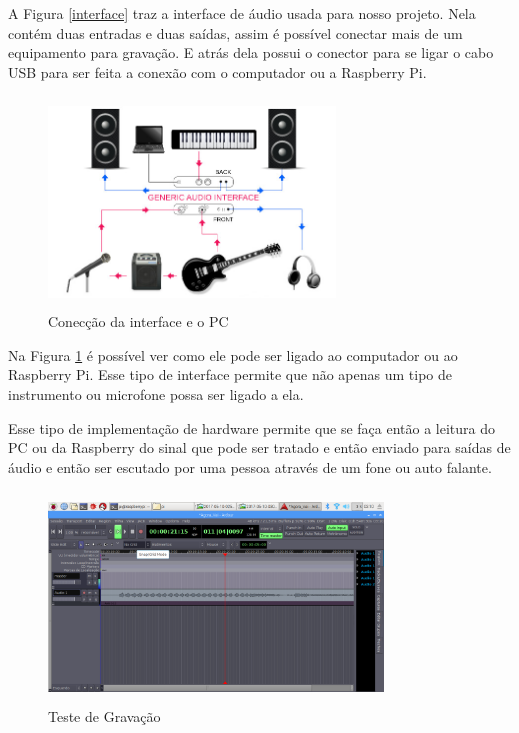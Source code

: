 \documentclass[conference]{IEEEtran}
\begin{document}
A Figura \ref{interface} traz a interface de áudio usada para nosso projeto. Nela contém duas entradas e duas saídas, assim é possível conectar mais de um equipamento para gravação. E atrás dela possui o conector para se ligar o cabo USB para ser feita a conexão com o computador ou a Raspberry Pi.

\begin{figure}[!htb]
\centering
\includegraphics[width=3.0in, height=2.2in]{Imagens/conection}
\caption{Conecção da interface e o PC} 
\label{conection}
\end{figure}

Na Figura \ref{conection} é possível ver como ele pode ser ligado ao computador ou ao Raspberry Pi. Esse tipo de interface permite que não apenas um tipo de instrumento ou microfone possa ser ligado a ela.

Esse tipo de implementação de hardware permite que se faça então a leitura do PC ou da Raspberry do sinal que pode ser tratado e então enviado para saídas de áudio e então ser escutado por uma pessoa através de um fone ou auto falante.

\begin{figure}[!htb]
\centering
\includegraphics[width=3.5in, height=2.2in]{Imagens/Simulacao_Ardour2}
\caption{Teste de Gravação} 
\label{Simulacao_Ardour}
\end{figure}
\end{document}
